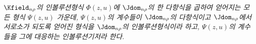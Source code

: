 
\emph{$\Kfield_{n\rho}$의 인볼루션형식 $\Phi(z,u)$에 $\Jdom_{n\rho}$의 한 다항식을 곱하여 얻어지는 모든 형식 $\Psi(z,u)$ 가운데, $\Psi(z,u)$의 계수들이 $\Jdom_{n\rho}$의 다항식이고 $\Jdom_{n\rho}$에서 서로소가 되도록 얻어진 형식을 $\Jdom_{n\rho}$의 인볼루션형식이라 하고, $\Psi(z,u)$의 계수들을 그에 대응하는 인볼루션기저라 한다.}
